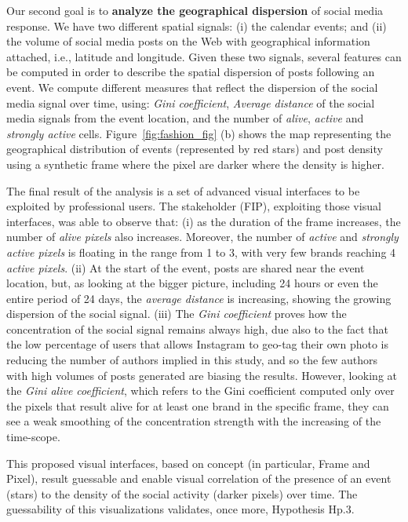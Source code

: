 Our second goal is to \textbf{analyze the geographical dispersion} of social media response. We have two different spatial signals: (i) the calendar events; and (ii) the volume of social media posts on the Web with geographical information attached, i.e., latitude and longitude. Given these two signals, several features can be computed in order to describe the spatial dispersion of posts following an event. 
We compute different measures that reflect the dispersion of the social media signal over time, using: \emph{Gini coefficient}, \emph{Average distance} of the social media signals from the event location, and the number of \emph{alive}, \emph{active} and \emph{strongly active} cells.
Figure~\ref{fig:fashion_fig} (b) shows the  map representing the geographical distribution of events (represented by red stars) and post density using a synthetic frame where the pixel are darker where the density is higher.

The final result of the analysis is a set of advanced visual interfaces to be exploited by professional users.
The stakeholder (FIP), exploiting those visual interfaces, was able to observe that: (i) as the duration of the frame increases, the number of \emph{alive pixels} also increases. Moreover, the number of \emph{active} and \emph{strongly active pixels} is floating in the range from 1 to 3, with very few brands reaching 4 \emph{active pixels}. (ii) At the start of the event, posts are shared near the event location, but, as looking at the bigger picture, including 24 hours or even the entire period of 24 days, the \emph{average distance} is increasing, showing the growing dispersion of the social signal. (iii) The \emph{Gini coefficient} proves how the concentration of the social signal remains always high, due also to the fact that the low percentage of users that allows Instagram to geo-tag their own photo is reducing the number of authors implied in this study, and so the few authors with high volumes of posts generated are biasing the results. However, looking at the \emph{Gini alive coefficient}, which refers to the Gini coefficient computed only over the pixels that result alive for at least one brand in the specific frame, they can see a weak smoothing of the concentration strength with the increasing of the time-scope.

This proposed visual interfaces, based on \frappe{} concept (in particular, Frame and Pixel), result guessable and enable visual correlation of the presence of an event (stars) to the density of the social activity (darker pixels) over time.
The guessability of this visualizations validates, once more, Hypothesis \textsf{Hp.3}.

